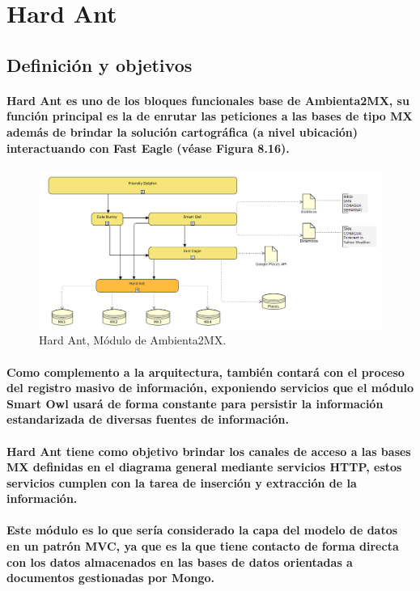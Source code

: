 \section{Hard Ant}
  \subsection{Definición y objetivos}    
    \paragraph{Hard Ant es uno de los bloques funcionales base de Ambienta2MX, su función principal es la de enrutar las peticiones a las bases de tipo MX además de brindar la solución cartográfica (a nivel ubicación) interactuando con Fast Eagle (véase Figura 8.16).}
    \begin{figure}[h!]
        \centering
          \includegraphics[width=\textwidth]{./images/DiagramaAmbienta2MX_HardAnt.png}
        \caption{Hard Ant, Módulo de Ambienta2MX.}
    \end{figure}
    \paragraph{Como complemento a la arquitectura, también contará con el proceso del registro masivo de información, exponiendo servicios que el módulo Smart Owl usará de forma constante para persistir la información estandarizada de diversas fuentes de información.}
    \paragraph{Hard Ant tiene como objetivo brindar los canales de acceso a las bases MX definidas en el diagrama general mediante servicios HTTP, estos servicios cumplen con la tarea de inserción y extracción de la información. }
    \paragraph{Este módulo es lo que sería considerado la capa del modelo de datos en un patrón MVC, ya que es la que tiene contacto de forma directa con los datos almacenados en las bases de datos orientadas a documentos gestionadas por Mongo.}
